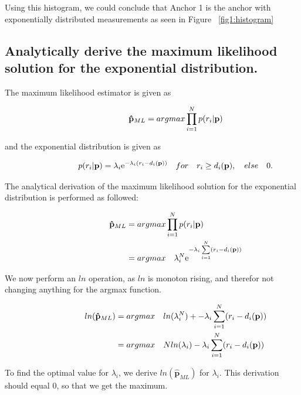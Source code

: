 Using this histogram, we could conclude that Anchor 1 is the anchor with exponentially distributed measurements as seen in Figure ~\ref{fig1:histogram} 

\subsection{Analytically derive the maximum likelihood solution for the exponential distribution.}

The maximum likelihood estimator is given as 

\begin{align*}
\hspace*{2cm}
\mathbf{\hat{p}}_{ML} = argmax \prod\limits_{i=1}^N p(r_i|\mathbf{p})
\end{align*}

and the exponential distribution is given as

\begin{align*}
\hspace*{2cm}
p(r_i|\mathbf{p}) = \lambda_i \exp{-\lambda_i(r_i-d_i(\mathbf{p}))} \quad for \quad r_i \geq d_i(\mathbf{p}), \quad else \quad 0.
\end{align*}

The analytical derivation of the maximum likelihood solution for the exponential distribution is performed as followed:

\begin{align*}
\hspace*{2cm}
\mathbf{\hat{p}}_{ML} &= argmax \prod\limits_{i=1}^N p(r_i|\mathbf{p})\\
&= argmax \quad \lambda_i^N \exp{-\lambda_i \sum\limits_{i=1}^N (r_i-d_i(\mathbf{p}))}
\end{align*}

We now perform an $ln$ operation, as $ln$ is monoton rising, and therefor not changing anything for the argmax function.

\begin{align*}
\hspace*{2cm}
ln(\mathbf{\hat{p}}_{ML}) &= argmax \quad ln(\lambda_i^N) + -\lambda_i \sum\limits_{i=1}^N (r_i-d_i(\mathbf{p}))\\
&= argmax \quad N ln(\lambda_i) - \lambda_i \sum\limits_{i=1}^N (r_i-d_i(\mathbf{p}))
\end{align*}

To find the optimal value for $\lambda_i$, we derive $ln(\mathbf{\hat{p}}_{ML})$ for $\lambda_i$. This derivation should equal $0$, so that we get the maximum.

